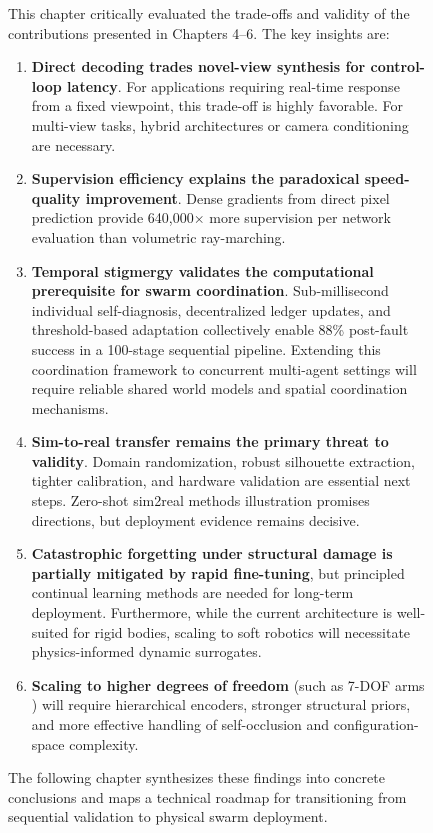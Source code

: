 \documentclass[12pt,a4paper,oneside]{report}
\begin{document}
\begin{figure}[H]
This chapter critically evaluated the trade-offs and validity of the contributions presented in Chapters 4--6. The key insights are:
\begin{enumerate}
    \item \textbf{Direct decoding trades novel-view synthesis for control-loop latency}. For applications requiring real-time response from a fixed viewpoint, this trade-off is highly favorable. For multi-view tasks, hybrid architectures or camera conditioning are necessary.
    \item \textbf{Supervision efficiency explains the paradoxical speed-quality improvement}. Dense gradients from direct pixel prediction provide 640,000$\times$ more supervision per network evaluation than volumetric ray-marching.
    \item \textbf{Temporal stigmergy validates the computational prerequisite for swarm coordination}. Sub-millisecond individual self-diagnosis, decentralized ledger updates, and threshold-based adaptation collectively enable 88\% post-fault success in a 100-stage sequential pipeline. Extending this coordination framework to concurrent multi-agent settings will require reliable shared world models and spatial coordination mechanisms.
    \item \textbf{Sim-to-real transfer remains the primary threat to validity}. Domain randomization, robust silhouette extraction, tighter calibration, and hardware validation are essential next steps. Zero-shot sim2real methods illustration promises directions, but deployment evidence remains decisive.
    \item \textbf{Catastrophic forgetting under structural damage is partially mitigated by rapid fine-tuning}, but principled continual learning methods are needed for long-term deployment. Furthermore, while the current architecture is well-suited for rigid bodies, scaling to soft robotics will necessitate physics-informed dynamic surrogates.
    \item \textbf{Scaling to higher degrees of freedom} (such as 7-DOF arms \cite{schulze2024high}) will require hierarchical encoders, stronger structural priors, and more effective handling of self-occlusion and configuration-space complexity.
\end{enumerate}

The following chapter synthesizes these findings into concrete conclusions and maps a technical roadmap for transitioning from sequential validation to physical swarm deployment.
\clearpage


\end{figure}
\end{document}
